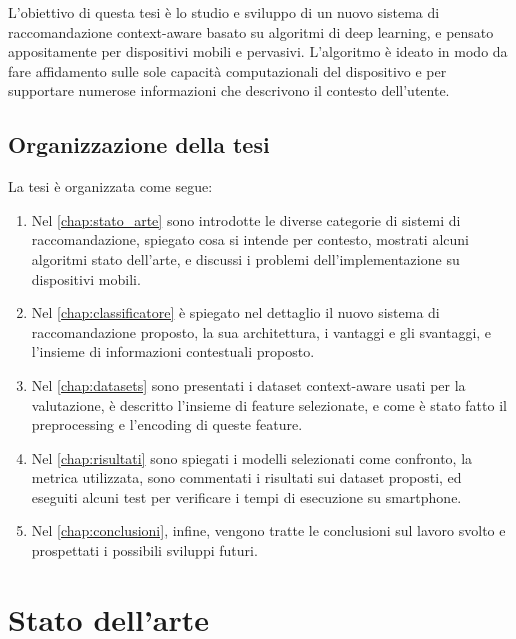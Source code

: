 \documentclass[12pt,italian]{report}
\begin{document}
L'obiettivo di questa tesi è lo studio e sviluppo di un nuovo sistema di raccomandazione context-aware basato su algoritmi di deep learning, e pensato appositamente per dispositivi mobili e pervasivi. L'algoritmo è ideato in modo da fare affidamento sulle sole capacità computazionali del dispositivo e per supportare numerose informazioni che descrivono il contesto dell'utente.

\section{Organizzazione della tesi}
\label{sec:organizzazione}
La tesi è organizzata come segue: 
\begin{enumerate}
\item Nel \autoref{chap:stato_arte} sono introdotte le diverse categorie di sistemi di raccomandazione, spiegato cosa si intende per contesto, mostrati alcuni algoritmi stato dell'arte, e discussi i problemi dell'implementazione su dispositivi mobili.

\item Nel \autoref{chap:classificatore} è spiegato nel dettaglio il nuovo sistema di raccomandazione proposto, la sua architettura, i vantaggi e gli svantaggi, e l'insieme di informazioni contestuali proposto.

\item Nel \autoref{chap:datasets} sono presentati i dataset context-aware usati per la valutazione, è descritto l'insieme di feature selezionate, e come è stato fatto il preprocessing e l'encoding di queste feature.

\item Nel \autoref{chap:risultati} sono spiegati i modelli selezionati come confronto, la metrica utilizzata, sono commentati i risultati sui dataset proposti, ed eseguiti alcuni test per verificare i tempi di esecuzione su smartphone.

\item Nel \autoref{chap:conclusioni}, infine, vengono tratte le conclusioni sul lavoro svolto e prospettati i possibili sviluppi futuri. 
\end{enumerate}


% 
% 

\chapter{Stato dell'arte}
\label{chap:stato_arte}
\end{document}
